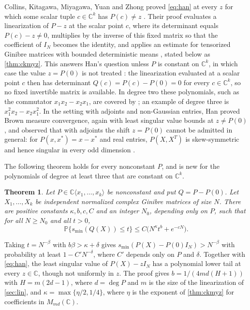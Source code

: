 \documentclass[11pt]{article}
\newtheorem{theorem}{Theorem}[section]
\theoremstyle{remark}
\newcommand{\C}{\mathbb C}
\newcommand{\Prob}{\mathbb P}
\newcommand{\smin}{s_{\min}}
\begin{document}
Collins, Kitagawa, Miyagawa, Yuan and Zhong \cite{CKMYZ} proved \eqref{eq:han} at every $z$ for which some scalar tuple $c\in\C^k$ has $P(c)\ne z$ \cite[Corollary~3.8]{CKMYZ}. Their proof evaluates a linearization of $P-z$ at the scalar point $c$, where its determinant equals $P(c)-z\ne0$, multiplies by the inverse of this fixed matrix so that the coefficient of $I_N$ becomes the identity, and applies an estimate for tensorized Ginibre matrices with bounded deterministic means \cite[Theorem~3.4]{CKMYZ}, stated below as \cref{thm:ckmyz}. This answers Han's question unless $P$ is constant on $\C^k$, in which case the value $z=P(0)$ is not treated \cite[Remark~3.9]{CKMYZ}: the linearization evaluated at a scalar point $c$ then has determinant $Q(c)=P(c)-P(0)=0$ for every $c\in\C^k$, so no fixed invertible matrix is available. In degree two these polynomials, such as the commutator $x_1x_2-x_2x_1$, are covered by \cite{CGH}; an example of degree three is $x_1^2x_2-x_2x_1^2$. In the setting with adjoints and non-Gaussian entries, Han \cite{Han2} proved Brown measure convergence, again with least singular value bounds at $z\ne P(0)$, and observed that with adjoints the shift $z=P(0)$ cannot be admitted in general: for $P(x,x^*)=x-x^*$ and real entries, $P(X,X^T)$ is skew-symmetric and hence singular in every odd dimension \cite[Remark~2.2]{Han2}.

The following theorem holds for every nonconstant $P$, and is new for the polynomials of degree at least three that are constant on $\C^k$.

\begin{theorem}\label{thm:main}
Let $P\in\C\langle x_1,\dots,x_k\rangle$ be nonconstant and put $Q=P-P(0)$. Let $X_1,\dots,X_k$ be independent normalized complex Ginibre matrices of size $N$. There are positive constants $\kappa,b,c,C$ and an integer $N_0$, depending only on $P$, such that for all $N\ge N_0$ and all $t>0$,
\begin{equation}\label{eq:main}
\Prob\{\smin(Q(X))\le t\}\le C\bigl(N^{\kappa}t^{b}+e^{-cN}\bigr).
\end{equation}
\end{theorem}

Taking $t=N^{-\beta}$ with $b\beta>\kappa+\delta$ gives $\smin(P(X)-P(0)I_N)>N^{-\beta}$ with probability at least $1-C'N^{-\delta}$, where $C'$ depends only on $P$ and $\delta$. Together with \eqref{eq:han}, the least singular value of $P(X)-zI_N$ has a polynomial lower tail at every $z\in\C$, though not uniformly in $z$. The proof gives $b=1/(4md(H+1))$ with $H=m(2d-1)$, where $d=\deg P$ and $m$ is the size of the linearization of \cref{sec:lin}, and $\kappa=\max\{\eta/2,1/4\}$, where $\eta$ is the exponent of \cref{thm:ckmyz} for coefficients in $M_{md}(\C)$.
\end{document}
